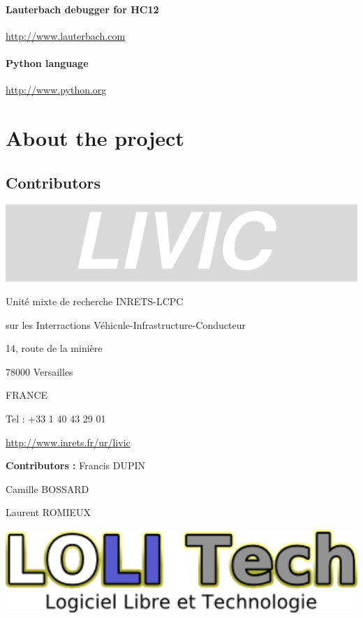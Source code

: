 \documentclass[12pt,twoside]{article}
\begin{document}
\paragraph{Lauterbach debugger for HC12}
\href{http://www.lauterbach.com/}{http://www.lauterbach.com}

\paragraph{Python language}
\href{http://www.python.org/}{http://www.python.org}

\clearpage\section{About the project}
\subsection{Contributors }
 \begin{center}
   \includegraphics[width=15cm]{Pictures/1000020100000258000000832C6FFAB4.png}
\end{center}

Unit\'e mixte de recherche INRETS{}-LCPC

sur les Interractions V\'ehicule{}-Infrastructure{}-Conducteur

14, route de la mini\`ere

78000 Versailles

FRANCE

Tel : +33 1 40 43 29 01

\href{http://www.inrets.fr/ur/livic}{http://www.inrets.fr/ur/livic}

\textbf{Contributors :} Francis DUPIN

   Camille BOSSARD

   Laurent ROMIEUX


\bigskip

 \begin{center}
   \includegraphics[width=15cm]{Pictures/100002010000013A0000004A96B0C1FF.png}
\end{center}
\end{document}
